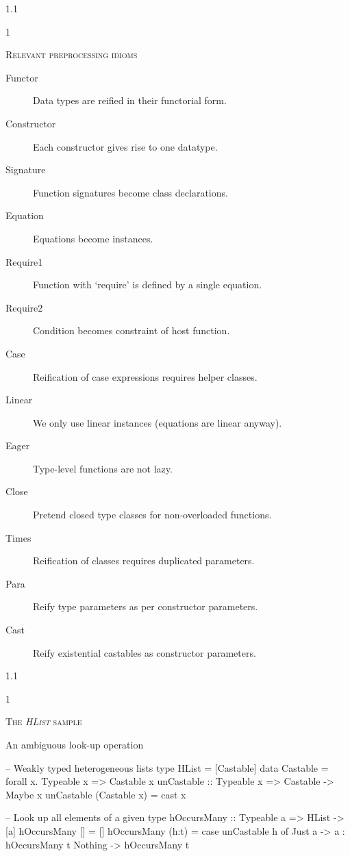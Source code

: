 \documentclass{slides}
\newcommand{\noskip}{\topsep0pt \parskip0pt \partopsep0pt}
\newcommand{\header}[1]{{\large\scshape \color{Red} #1} \medskip }
\newcommand{\blau}[1]{{\color{Blue} #1} \medskip }
\newenvironment{myslide}{\begin{slide}\color{Blue}\begin{boxedminipage}{1.1\hsize}\begin{boxedminipage}{1\hsize}\color{Black}
\vspace{-170\in}
}{%
\smallskip
\end{boxedminipage}
\end{boxedminipage}
\end{slide}}
\begin{document}



\begin{myslide}

\header{Relevant preprocessing idioms}

{\small

\noskip\begin{description}
\item[Functor] Data types are reified in their functorial form.
\item[Constructor] Each constructor gives rise to one datatype.
\item[Signature] Function signatures become class declarations.
\item[Equation] Equations become instances.
\item[Require1] Function with `require' is defined by a single equation.
\item[Require2] Condition becomes constraint of host function.
\item[Case] Reification of case expressions requires helper classes.
\item[Linear] We only use linear instances (equations are linear anyway).
\item[Eager] Type-level functions are not lazy.
\item[Close] Pretend closed type classes for non-overloaded functions.
\item[Times] Reification of classes requires duplicated parameters.
\item[Para] Reify type parameters as per constructor parameters.
\item[Cast] Reify existential castables as constructor parameters.
\end{description}

}

\end{myslide}






\begin{myslide}

\header{The \emph{HList} sample}

\blau{An ambiguous look-up operation}

{\tiny

\begin{code}
-- Weakly typed heterogeneous lists
type HList    = [Castable]
data Castable = forall x. Typeable x => Castable x 
unCastable :: Typeable x => Castable -> Maybe x
unCastable (Castable x) = cast x

-- Look up all elements of a given type
hOccursMany :: Typeable a => HList -> [a]
hOccursMany [] = []
hOccursMany (h:t) = case unCastable h of
                      Just a  -> a : hOccursMany t
                      Nothing -> hOccursMany t
\end{code}

}

\end{myslide}
\end{document}
